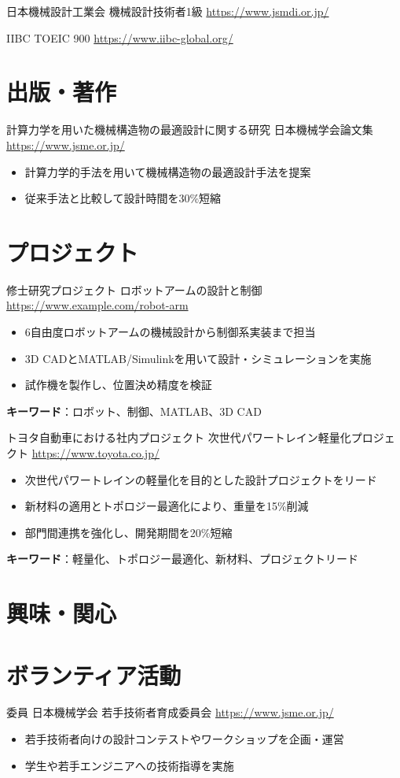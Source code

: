 \documentclass[a4paper, serif, 10pt]{moderncv}
\begin{document}
        {日本機械設計工業会}
        {機械設計技術者1級}
        {\url{https://www.jsmdi.or.jp/}}
        {}
        {}

        {IIBC}
        {TOEIC 900}
        {\url{https://www.iibc-global.org/}}
        {}
        {}
\section{出版・著作}

        {計算力学を用いた機械構造物の最適設計に関する研究}
        {日本機械学会論文集}
        {\url{https://www.jsme.or.jp/}}
        {}
        {\begin{itemize}
\item 計算力学的手法を用いて機械構造物の最適設計手法を提案
\item 従来手法と比較して設計時間を30\%短縮
\end{itemize}}
\section{プロジェクト}

        {修士研究プロジェクト}
        {ロボットアームの設計と制御}
        {\url{https://www.example.com/robot-arm}}
        {}
        {\begin{itemize}
\item 6自由度ロボットアームの機械設計から制御系実装まで担当
\item 3D CADとMATLAB/Simulinkを用いて設計・シミュレーションを実施
\item 試作機を製作し、位置決め精度を検証
\end{itemize}
\textbf{キーワード}：ロボット、制御、MATLAB、3D CAD}

        {トヨタ自動車における社内プロジェクト}
        {次世代パワートレイン軽量化プロジェクト}
        {\url{https://www.toyota.co.jp/}}
        {}
        {\begin{itemize}
\item 次世代パワートレインの軽量化を目的とした設計プロジェクトをリード
\item 新材料の適用とトポロジー最適化により、重量を15\%削減
\item 部門間連携を強化し、開発期間を20\%短縮
\end{itemize}
\textbf{キーワード}：軽量化、トポロジー最適化、新材料、プロジェクトリード}
\section{興味・関心}

\section{ボランティア活動}

        {委員}
        {日本機械学会 若手技術者育成委員会}
        {\url{https://www.jsme.or.jp/}}
        {}
        {\begin{itemize}
\item 若手技術者向けの設計コンテストやワークショップを企画・運営
\item 学生や若手エンジニアへの技術指導を実施
\end{itemize}}
    
\end{document}
